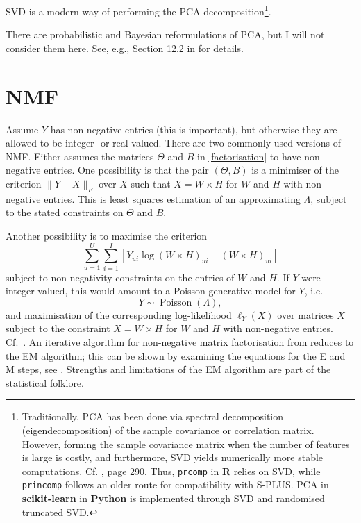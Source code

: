 \documentclass[]{article}
\begin{document}
SVD is a modern way of performing the PCA decomposition\footnote{Traditionally, PCA has been done via spectral decomposition (eigendecomposition) of the sample covariance or correlation matrix. However, forming the sample covariance matrix when the number of features is large is costly, and furthermore, SVD yields numerically more stable computations. Cf. \citet{ripley1996}, page 290. Thus, \texttt{prcomp} in {\bf R} relies on SVD, while \texttt{princomp} follows an older route for compatibility with S-PLUS. PCA in {\bf scikit-learn} in {\bf Python} is implemented through SVD and randomised truncated SVD.}.

There are probabilistic and Bayesian reformulations of PCA, but I will not consider them here. See, e.g., Section 12.2 in \citet{bishop2006} for details.

\section{NMF}

Assume $Y$ has non-negative entries (this is important), but otherwise they are allowed to be integer- or real-valued. There are two commonly used versions of NMF. Either assumes the matrices $\Theta$ and $B$ in \eqref{factorisation} to have non-negative entries. One possibility is that the pair $(\Theta, B)$ is a minimiser of the criterion $\| Y - X  \|_F$
over $X$ such that $X=W \times H$ for $W$ and $H$ with non-negative entries. This is least squares estimation of an approximating $\Lambda$, subject to the stated constraints on $\Theta$ and $B$.

Another possibility is to maximise the criterion
\begin{equation}
\label{poisson_crit}
\sum_{u=1}^U \sum_{i=1}^I \left[  Y_{ui} \log(W \times H)_{ui} - (W \times H)_{ui}  \right]
\end{equation}
subject to non-negativity constraints on the entries of $W$ and $H$. If $Y$ were integer-valued, this would amount to a Poisson generative model for $Y$, i.e.
\[
Y \sim \operatorname{Poisson}(\Lambda),
\]
and maximisation of the corresponding log-likelihood $\ell_Y(X)$ over matrices $X$ subject to the constraint $X=W \times H$ for $W$ and $H$ with non-negative entries. Cf.\ \citet{lee1999}. An iterative algorithm for non-negative matrix factorisation from \citet{lee1999} reduces to the EM algorithm; this can be shown by examining the equations for the E and M steps, see \citet{cemgil2009}. Strengths and limitations of the EM algorithm are part of the statistical folklore.
\end{document}
